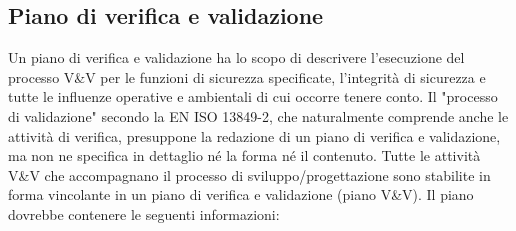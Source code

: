 \subsection{Piano di verifica e validazione}
\label{subsec:07-1-2}
Un piano di verifica e validazione ha lo scopo di descrivere l'esecuzione del processo V\&V per le funzioni di sicurezza specificate, l'integrità di sicurezza e tutte le influenze operative e ambientali di cui occorre tenere conto. Il "processo di validazione" secondo la EN ISO 13849-2, che naturalmente comprende anche le attività di verifica, presuppone la redazione di un piano di verifica e validazione, ma non ne specifica in dettaglio né la forma né il contenuto. Tutte le attività V\&V che accompagnano il processo di sviluppo/progettazione sono stabilite in forma vincolante in un piano di verifica e validazione (piano V\&V). Il piano dovrebbe contenere le seguenti informazioni:
